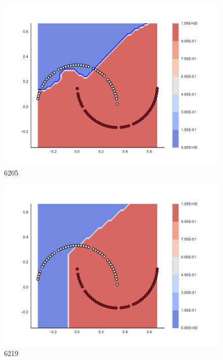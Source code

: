 \begin{subfigure}[b]{0.09\textwidth}
    \includegraphics[width=\textwidth]{img/convergence/6205.pdf}
    \caption{6205}
    \label{fig:convergence_6205}
\end{subfigure}
%
\begin{subfigure}[b]{0.09\textwidth}
    \includegraphics[width=\textwidth]{img/convergence/6219.pdf}
    \caption{6219}
    \label{fig:convergence_6219}
\end{subfigure}
%
